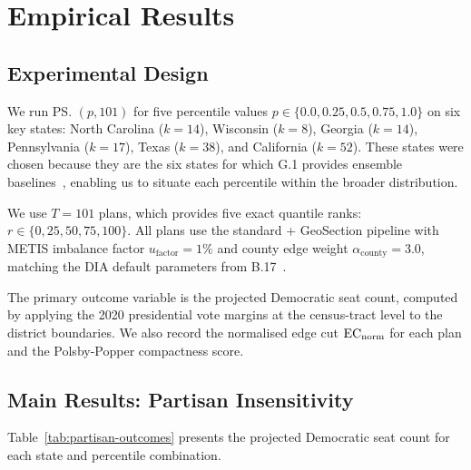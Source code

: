 \section{Empirical Results}
\label{sec:results}

\subsection{Experimental Design}

We run \ps{}$(p, 101)$ for five percentile values $p \in \{0.0, 0.25, 0.5,
0.75, 1.0\}$ on six key states: North Carolina ($k = 14$), Wisconsin ($k = 8$),
Georgia ($k = 14$), Pennsylvania ($k = 17$), Texas ($k = 38$), and
California ($k = 52$).
These states were chosen because they are the six states for which G.1
provides \gc{} ensemble baselines~\citep{g1paper}, enabling us to situate
each percentile within the broader \recom{} distribution.

We use $T = 101$ plans, which provides five exact quantile ranks:
$r \in \{0, 25, 50, 75, 100\}$.
All plans use the standard \ar{} + GeoSection pipeline with METIS imbalance
factor $u_{\mathrm{factor}} = 1\%$ and county edge weight
$\alpha_{\mathrm{county}} = 3.0$, matching the DIA default parameters from
B.17~\citep{b17paper}.

The primary outcome variable is the projected Democratic seat count, computed
by applying the 2020 presidential vote margins at the census-tract level to
the district boundaries.
We also record the normalised edge cut $\mathrm{EC}_{\mathrm{norm}}$ for each plan and the
Polsby-Popper compactness score.

\subsection{Main Results: Partisan Insensitivity}

Table~\ref{tab:partisan-outcomes} presents the projected Democratic seat
count for each state and percentile combination.

